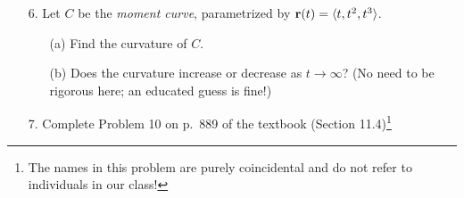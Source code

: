 \documentclass[reqno, 12pt]{amsart}
\begin{document}
\begin{itemize}
\newpage
\item[6.] Let $C$ be the \emph{moment curve}, parametrized by ${\bf r}(t) = \langle t, t^2, t^3 \rangle$.

\smallskip
\begin{itemize}
\item[(a)] Find the curvature of $C$.

\vspace{4 in}
\item[(b)] Does the curvature increase or decrease as $t \rightarrow \infty$? (No need to be rigorous here; an educated guess is fine!)
\end{itemize}

\newpage
\item[7.] Complete Problem 10 on p.~889 of the textbook (Section 11.4)\footnote{The names in this problem are purely coincidental and do not refer to individuals in our class!}

\end{itemize}
\end{document}
